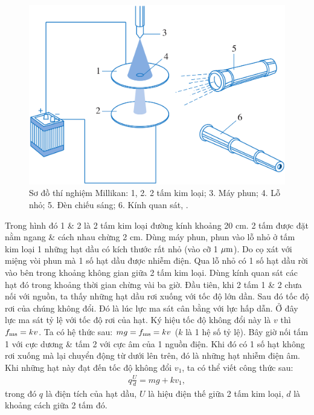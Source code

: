 \documentclass[oneside]{book}
\numberwithin{equation}{section}
\begin{document}
\begin{figure}[H]
	\centering
	\includegraphics[scale=0.15]{so_do_thi_nghiem_Millikan}
	\caption{Sơ đồ thí nghiệm Millikan: 1, 2. 2 tấm kim loại; 3. Máy phun; 4. Lỗ nhỏ; 5. Đèn chiếu sáng; 6. Kính quan sát, \cite[Hình 4.6, p. 24]{SGK_Vat_Ly_11_nang_cao}.}
	\label{fig:so_do_thi_nghiem_Millikan}
\end{figure}
Trong hình đó 1 \& 2 là 2 tấm kim loại đường kính khoảng 20 cm. 2 tấm được đặt nằm ngang \& cách nhau chừng 2 cm. Dùng máy phun, phun vào lỗ nhỏ ở tấm kim loại 1 những hạt dầu có kích thước rất nhỏ (vào cỡ 1 $\rm\mu m$). Do cọ xát với miệng vòi phun mà 1 số hạt dầu được nhiễm điện. Qua lỗ nhỏ có 1 số hạt dầu rời vào bên trong khoảng không gian giữa 2 tấm kim loại. Dùng kính quan sát các hạt đó trong khoảng thời gian chừng vài ba giờ. Đầu tiên, khi 2 tấm 1 \& 2 chưa nối với nguồn, ta thấy những hạt dầu rơi xuống với tốc độ lớn dần. Sau đó tốc độ rơi của chúng không đổi. Đó là lúc lực ma sát cân bằng với lực hấp dẫn. Ở đây lực ma sát tỷ lệ với tốc độ rơi của hạt. Ký hiệu tốc độ không đổi này là $v$ thì $f_{\rm ms} = kv$. Ta có hệ thức sau: $mg = f_{\rm ms} = kv$  ($k$ là 1 hệ số tỷ lệ). Bây giờ nối tấm 1 với cực dương \& tấm 2 với cực âm của 1 nguồn điện. Khi đó có 1 số hạt không rơi xuống mà lại chuyển động từ dưới lên trên, đó là những hạt nhiễm điện âm. Khi những hạt này đạt đến tốc độ không đổi $v_1$, ta có thể viết công thức sau:
\begin{align}
	\label{SGK Vat ly 11 (1) p. 24}
	q\frac{U}{d} = mg + kv_1,
\end{align}
trong đó $q$ là điện tích của hạt dầu, $U$ là hiệu điện thế giữa 2 tấm kim loại, $d$ là khoảng cách giữa 2 tấm đó.
\end{document}
